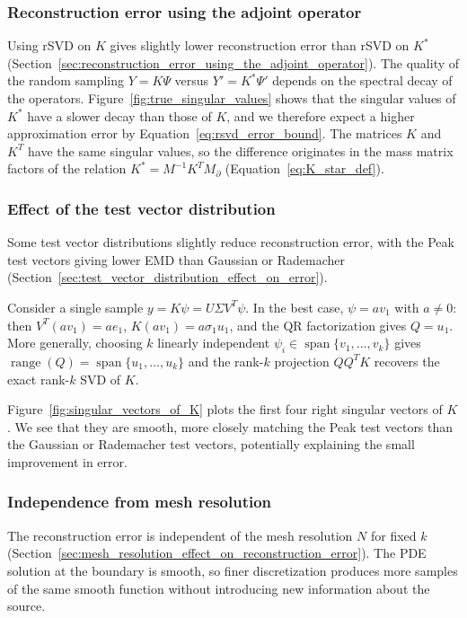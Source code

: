 \subsubsection{Reconstruction error using the adjoint operator}

Using rSVD on $K$ gives slightly lower reconstruction error than rSVD on $K^*$ (Section~\ref{sec:reconstruction_error_using_the_adjoint_operator}). The quality of the random sampling $Y = K\Psi$ versus $Y' = K^* \Psi'$ depends on the spectral decay of the operators. Figure~\ref{fig:true_singular_values} shows that the singular values of $K^*$ have a slower decay than those of $K$, and we therefore expect a higher approximation error by Equation~\eqref{eq:rsvd_error_bound}. The matrices $K$ and $K^T$ have the same singular values, so the difference originates in the mass matrix factors of the relation $K^* = M^{-1} K^T M_\partial$ (Equation~\eqref{eq:K_star_def}).


\subsubsection{Effect of the test vector distribution}

Some test vector distributions slightly reduce reconstruction error, with the Peak test vectors giving lower EMD than Gaussian or Rademacher (Section~\ref{sec:test_vector_distribution_effect_on_error}).

Consider a single sample $y = K \psi = U \Sigma V^T \psi$. In the best case, $\psi = a v_1$ with $a \neq 0$: then $V^T(a v_1) = a e_1$, $K(a v_1) = a \sigma_1 u_1$, and the QR factorization gives $Q = u_1$. More generally, choosing $k$ linearly independent $\psi_i \in \operatorname{span}\{ v_1,\dots,v_k \}$ gives $\operatorname{range}(Q) = \operatorname{span}\{u_1,\dots,u_k\}$ and the rank-$k$ projection $QQ^T K$ recovers the exact rank-$k$ SVD of $K$.

Figure~\ref{fig:singular_vectors_of_K} plots the first four right singular vectors of $K$. We see that they are smooth, more closely matching the Peak test vectors than the Gaussian or Rade\-macher test vectors, potentially explaining the small improvement in error.


\subsubsection{Independence from mesh resolution}
The reconstruction error is independent of the mesh resolution $N$ for fixed $k$ (Section~\ref{sec:mesh_resolution_effect_on_reconstruction_error}). The PDE solution at the boundary is smooth, so finer discretization produces more samples of the same smooth function without introducing new information about the source.

